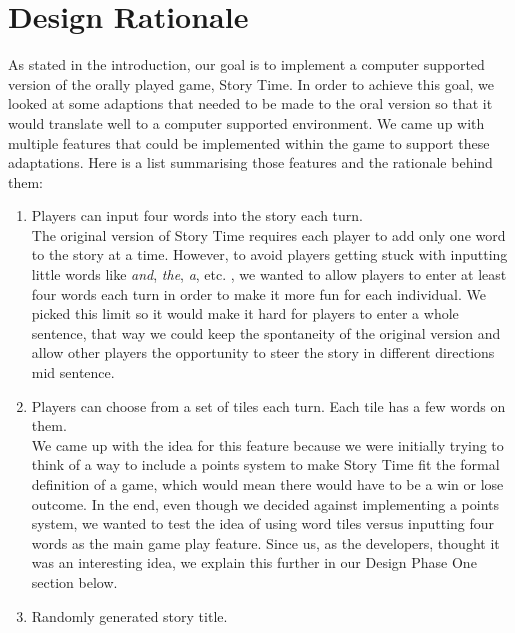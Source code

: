 \documentclass{sigchi}
\begin{document}
\section{Design Rationale}
As stated in the introduction, our goal is to implement a computer supported version of the orally played game, Story Time. In order to achieve this goal, we looked at some adaptions that needed to be made to the oral version so that it would translate well to a computer supported environment. We came up with multiple features that could be implemented within the game to support these adaptations. Here is a list summarising those features and the rationale behind them:
\begin{enumerate}[leftmargin=.15in,noitemsep]
\item Players can input four words into the story each turn.\\

The original version of Story Time requires each player to add only one word to the story at a time. However, to avoid players getting stuck with inputting little words like \textit{and}, \textit{the}, \textit{a}, etc. , we wanted to allow players to enter at least four words each turn in order to make it more fun for each individual. We picked this limit so it would make it hard for players to enter a whole sentence, that way we could keep the spontaneity of the original version and allow other players the opportunity to steer the story in different directions mid sentence. \\

\item Players can choose from a set of tiles each turn. Each tile has a few words on them.\\

We came up with the idea for this feature because we were initially trying to think of a way to include a points system to make Story Time fit the formal definition of a game, which would mean there would have to be a win or lose outcome. In the end, even though we decided against implementing a points system, we wanted to test the idea of using word tiles versus inputting four words as the main game play feature. Since us, as the developers, thought it was an interesting idea, we explain this further in our Design Phase One section below. \\

\item Randomly generated story title.\\


\end{enumerate}
\end{document}
